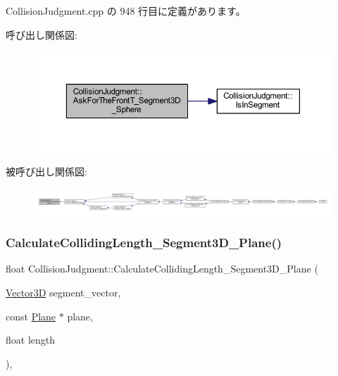  Collision\+Judgment.\+cpp の 948 行目に定義があります。

呼び出し関係図\+:\nopagebreak
\begin{figure}[H]
\begin{center}
\leavevmode
\includegraphics[width=350pt]{class_collision_judgment_adbf036202ba174c7e9fc10329aeaa2c1_cgraph}
\end{center}
\end{figure}
被呼び出し関係図\+:
\nopagebreak
\begin{figure}[H]
\begin{center}
\leavevmode
\includegraphics[width=350pt]{class_collision_judgment_adbf036202ba174c7e9fc10329aeaa2c1_icgraph}
\end{center}
\end{figure}
\mbox{\label{class_collision_judgment_aad2a3d57a7b1c44e894b7a6c1a6ecde0}} 
\subsubsection{\texorpdfstring{Calculate\+Colliding\+Length\+\_\+\+Segment3\+D\+\_\+\+Plane()}{CalculateCollidingLength\_Segment3D\_Plane()}}
{\footnotesize\ttfamily float Collision\+Judgment\+::\+Calculate\+Colliding\+Length\+\_\+\+Segment3\+D\+\_\+\+Plane (\begin{DoxyParamCaption}\item[{\mbox{\hyperlink{class_vector3_d}{Vector3D}}}]{segment\+\_\+vector,  }\item[{const \mbox{\hyperlink{class_plane}{Plane}} $\ast$}]{plane,  }\item[{float}]{length }\end{DoxyParamCaption})\hspace{0.3cm}{\ttfamily [static]}, {\ttfamily [private]}}




